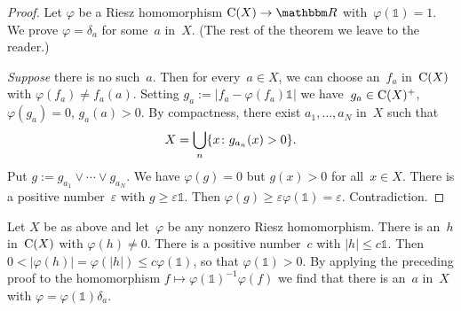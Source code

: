 \documentclass[main.tex]{subfiles}
\begin{document}
\begin{proof}
Let $\varphi$ be a Riesz homomorphism $\Cont{X}\ra \R$
with~$\varphi(\mathbb{1})=1$.
We prove $\varphi=\delta_a$ for some~$a$ in~$X$.
(The rest of the theorem 
we leave to the reader.)

\emph{Suppose} there is no such~$a$.
Then for every~$a\in X$,
we can choose an~$f_a$ in~$\mathrm{C}(X)$
with $\varphi(f_a)\neq f_a(a)$.
Setting $g_a := | f_a - \varphi(f_a) \mathbb{1}|$
we have~$g_a \in \mathrm{C}(X)^+$,
$\varphi(g_a)=0$,
$g_a(a)>0$.
By compactness,
there exist $a_1,\dotsc,a_N$ in~$X$ such that
\begin{equation*}
X = \bigcup_n \{ x\colon g_{a_n} (x) > 0 \}\text{.}
\end{equation*}
Put $g:=g_{a_1}\vee \dotsb \vee g_{a_N}$.
We have $\varphi(g) =0$ 
but $g(x)>0$ for all~$x\in X$.
There is a positive number~$\varepsilon$
with $g\geq \varepsilon \mathbb{1}$.
Then $\varphi(g)\geq \varepsilon \varphi(\mathbb{1})=\varepsilon$.
Contradiction. \xqed
\end{proof}
%
%
\begin{psec}{2.17}%
Let $X$ be as above 
and let~$\varphi$ be any nonzero Riesz homomorphism.
There is an~$h$ in~$\mathrm{C}(X)$
with $\varphi(h)\neq 0$.
There is a positive number~$c$
with $|h|\leq c\mathbb{1}$.
Then $0<|\varphi(h)|=\varphi(|h|)\leq c\varphi(\mathbb{1})$,
so that $\varphi(\mathbb{1})>0$.
By applying the preceding proof to
the homomorphism $f\mapsto \varphi(\mathbb{1})^{-1} \varphi(f)$
we find that there is an~$a$ in~$X$ 
with $\varphi = \varphi(\mathbb{1})\delta_a$.
\end{psec}
\clearpage
\end{document}
